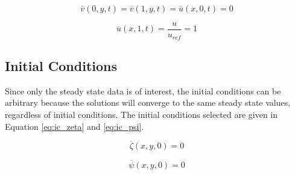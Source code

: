 \begin{equation}
\label{eq:v_stationary} 
\overline{v}(0,y,t) = \overline{v}(1,y,t) = \overline{u}(x,0,t) = 0
\end{equation}

\begin{equation}
\label{eq:v_moving} 
\overline{u}(x,1,t) = \frac{u}{u_{ref}} = 1
\end{equation}




	\subsection{Initial Conditions}

Since only the steady state data is of interest, the initial conditions can be arbitrary because the solutions will converge to the same steady state values, regardless of initial conditions.  The initial conditions selected are given in Equation \ref{eq:ic_zeta} and \ref{eq:ic_psi}.

\begin{equation}
\label{eq:ic_zeta} 
\overline{\zeta}(x,y,0) = 0
\end{equation}

\begin{equation}
\label{eq:ic_psi} 
\overline{\psi}(x,y,0) = 0
\end{equation}	
	
